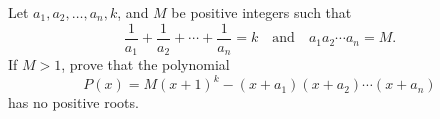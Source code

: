 Let $a_1, a_2, \ldots, a_n, k$, and $M$ be positive integers such that
\[
\frac{1}{a_1} + \frac{1}{a_2} + \cdots + \frac{1}{a_n} = k \quad \text{and} \quad a_1 a_2 \cdots a_n = M.
\]
If $M > 1$, prove that the polynomial
\[
P(x) = M(x+1)^k - (x+a_1)(x+a_2)\cdots(x+a_n)
\]
has no positive roots.
